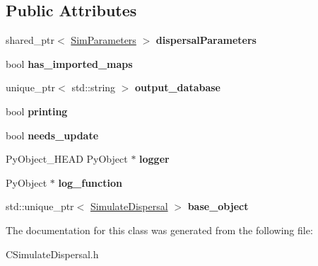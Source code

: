 \subsection*{Public Attributes}
\begin{DoxyCompactItemize}
\item 
shared\+\_\+ptr$<$ \hyperlink{struct_sim_parameters}{Sim\+Parameters} $>$ {\bfseries dispersal\+Parameters}\hypertarget{class_py_simulate_dispersal_aa609cba7b628eb34f6eee0376dcae00b}{}\label{class_py_simulate_dispersal_aa609cba7b628eb34f6eee0376dcae00b}

\item 
bool {\bfseries has\+\_\+imported\+\_\+maps}\hypertarget{class_py_simulate_dispersal_a5594ed1200643d899b5eb2541488217a}{}\label{class_py_simulate_dispersal_a5594ed1200643d899b5eb2541488217a}

\item 
unique\+\_\+ptr$<$ std\+::string $>$ {\bfseries output\+\_\+database}\hypertarget{class_py_simulate_dispersal_a2f792e38bcb2cebf921cb001d6058108}{}\label{class_py_simulate_dispersal_a2f792e38bcb2cebf921cb001d6058108}

\item 
bool {\bfseries printing}\hypertarget{class_py_simulate_dispersal_a95ccf647e55688481b7a9daaaa1f99b8}{}\label{class_py_simulate_dispersal_a95ccf647e55688481b7a9daaaa1f99b8}

\item 
bool {\bfseries needs\+\_\+update}\hypertarget{class_py_simulate_dispersal_af344386936e2e70b17d44351f63d2af9}{}\label{class_py_simulate_dispersal_af344386936e2e70b17d44351f63d2af9}

\item 
Py\+Object\+\_\+\+H\+E\+AD Py\+Object $\ast$ {\bfseries logger}\hypertarget{class_py_template_a5b741a472639d65f9bcad29afa16ec99}{}\label{class_py_template_a5b741a472639d65f9bcad29afa16ec99}

\item 
Py\+Object $\ast$ {\bfseries log\+\_\+function}\hypertarget{class_py_template_a98bb8152faa73d028342d5cf260f0372}{}\label{class_py_template_a98bb8152faa73d028342d5cf260f0372}

\item 
std\+::unique\+\_\+ptr$<$ \hyperlink{class_simulate_dispersal}{Simulate\+Dispersal} $>$ {\bfseries base\+\_\+object}\hypertarget{class_py_template_abcd20aea11103e6764f38cf5ed4085ca}{}\label{class_py_template_abcd20aea11103e6764f38cf5ed4085ca}

\end{DoxyCompactItemize}


The documentation for this class was generated from the following file\+:\begin{DoxyCompactItemize}
\item 
C\+Simulate\+Dispersal.\+h\end{DoxyCompactItemize}
